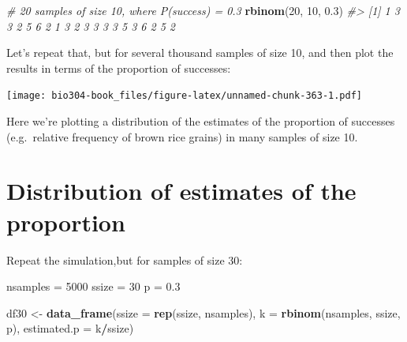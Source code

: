 \documentclass[]{book}
\newenvironment{Shaded}{\begin{snugshade}}{\end{snugshade}}
\newcommand{\CommentTok}[1]{\textcolor[rgb]{0.56,0.35,0.01}{\textit{#1}}}
\newcommand{\DataTypeTok}[1]{\textcolor[rgb]{0.13,0.29,0.53}{#1}}
\newcommand{\DecValTok}[1]{\textcolor[rgb]{0.00,0.00,0.81}{#1}}
\newcommand{\FloatTok}[1]{\textcolor[rgb]{0.00,0.00,0.81}{#1}}
\newcommand{\KeywordTok}[1]{\textcolor[rgb]{0.13,0.29,0.53}{\textbf{#1}}}
\newcommand{\NormalTok}[1]{#1}
\newcommand{\OperatorTok}[1]{\textcolor[rgb]{0.81,0.36,0.00}{\textbf{#1}}}
\newcommand{\StringTok}[1]{\textcolor[rgb]{0.31,0.60,0.02}{#1}}
\theoremstyle{definition}
\theoremstyle{definition}
\theoremstyle{definition}
\theoremstyle{remark}
\begin{document}
\begin{Shaded}
\begin{Highlighting}[]
\CommentTok{# 20 samples of size 10, where P(success) = 0.3}
\KeywordTok{rbinom}\NormalTok{(}\DecValTok{20}\NormalTok{, }\DecValTok{10}\NormalTok{, }\FloatTok{0.3}\NormalTok{)}
\CommentTok{#>  [1] 1 3 3 2 5 6 2 1 3 2 3 3 3 3 5 3 6 2 5 2}
\end{Highlighting}
\end{Shaded}

Let's repeat that, but for several thousand samples of size 10, and then
plot the results in terms of the proportion of successes:

\begin{Shaded}
\end{Shaded}

\texttt{[image: bio304-book\_files/figure-latex/unnamed-chunk-363-1.pdf]}

Here we're plotting a distribution of the estimates of the proportion of
successes (e.g.~relative frequency of brown rice grains) in many samples
of size 10.

\hypertarget{distribution-of-estimates-of-the-proportion}{%
\section{Distribution of estimates of the
proportion}\label{distribution-of-estimates-of-the-proportion}}

Repeat the simulation,but for samples of size 30:

\begin{Shaded}
\begin{Highlighting}[]
\NormalTok{nsamples =}\StringTok{ }\DecValTok{5000}
\NormalTok{ssize =}\StringTok{ }\DecValTok{30}
\NormalTok{p =}\StringTok{ }\FloatTok{0.3}

\NormalTok{df30 <-}\StringTok{ }\KeywordTok{data_frame}\NormalTok{(}\DataTypeTok{ssize =} \KeywordTok{rep}\NormalTok{(ssize, nsamples),}
                   \DataTypeTok{k =} \KeywordTok{rbinom}\NormalTok{(nsamples, ssize, p),}
                   \DataTypeTok{estimated.p =}\NormalTok{ k}\OperatorTok{/}\NormalTok{ssize)}
\end{Highlighting}
\end{Shaded}
\end{document}
